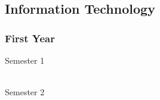 \subsection{Information Technology}

\subsubsection{First Year}
\begin{center}
\begin{multicols}{2}
Semester 1 \\
 \\
\vfill
\columnbreak

Semester 2 \\
 \\
\end{multicols}
\end{center}
